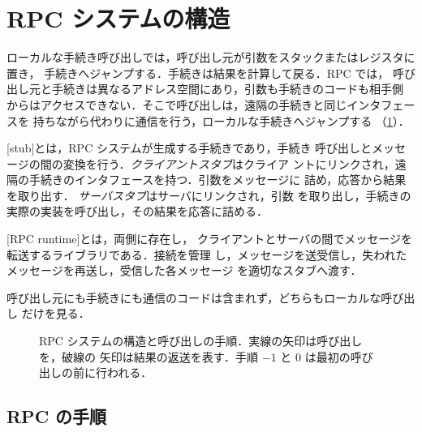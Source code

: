 \documentclass[../main.tex]{subfiles}
\begin{document}
\section{RPC システムの構造}
\label{sec:l13-structure}

ローカルな手続き呼び出しでは，呼び出し元が引数をスタックまたはレジスタに置き，
手続きへジャンプする．手続きは結果を計算して戻る．RPC では，
呼び出し元と手続きは異なるアドレス空間にあり，引数も手続きのコードも相手側
からはアクセスできない．そこで呼び出しは，遠隔の手続きと同じインタフェースを
持ちながら代わりに通信を行う，ローカルな手続きへジャンプする
（\cref{fig:l13-steps}）．

\begin{definition}[スタブ]
  [stub]とは，RPC システムが生成する手続きであり，手続き
  呼び出しとメッセージの間の変換を行う．\emph{クライアントスタブ}はクライア
  ントにリンクされ，遠隔の手続きのインタフェースを持つ．引数をメッセージに
  詰め，応答から結果を取り出す．%
  \emph{サーバスタブ}はサーバにリンクされ，引数
  を取り出し，手続きの実際の実装を呼び出し，その結果を応答に詰める．
\end{definition}

\begin{definition}
  [RPC runtime]とは，両側に存在し，
  クライアントとサーバの間でメッセージを転送するライブラリである．接続を管理
  し，メッセージを送受信し，失われたメッセージを再送し，受信した各メッセージ
  を適切なスタブへ渡す．
\end{definition}

呼び出し元にも手続きにも通信のコードは含まれず，どちらもローカルな呼び出し
だけを見る．

\begin{figure}[htbp]
  \centering
  
  \caption{RPC システムの構造と呼び出しの手順．実線の矢印は呼び出しを，破線の
    矢印は結果の返送を表す．手順 $-1$ と 0 は最初の呼び出しの前に行われる．}
  \label{fig:l13-steps}
\end{figure}

\subsection{RPC の手順}
\end{document}
